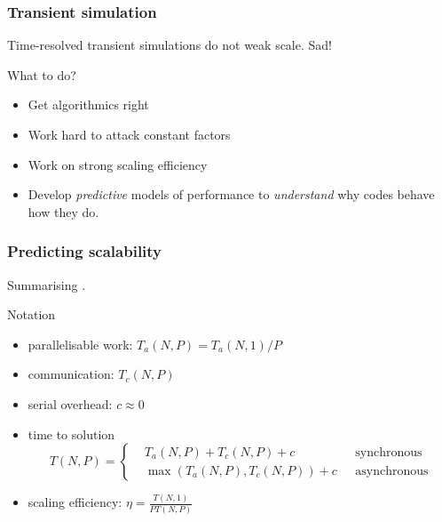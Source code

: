 \documentclass[presentation]{beamer}
\begin{document}
\begin{frame}
  \frametitle{Transient simulation}
  {\large
    Time-resolved transient simulations do not weak scale. Sad!
  }

  \begin{block}{What to do?}
    \begin{itemize}
    \item Get algorithmics right
    \item Work hard to attack constant factors
    \item Work on strong scaling efficiency
    \item Develop \emph{predictive} models of performance to
      \emph{understand} why codes behave how they do.
    \end{itemize}
  \end{block}

\end{frame}

\begin{frame}
  \frametitle{Predicting scalability}

  Summarising \textcite{Fischer:2015}.
  
  \begin{block}{Notation}
    \begin{itemize}
    \item parallelisable work: $T_a(N, P) = T_a(N, 1)/P$

    \item communication: $T_c(N, P)$

    \item serial overhead: $c \approx 0$

    \item time to solution
      \begin{equation*}
        T(N, P) = \left\{
          \begin{split}
            &T_a(N, P) + T_c(N, P) + c &\text{ synchronous}\\
            &\max(T_a(N, P), T_c(N, P)) + c\,\,&\text{ asynchronous}
          \end{split}\right.
      \end{equation*}

    \item scaling efficiency: $\eta = \frac{T(N, 1)}{PT(N,P)}$
  \end{itemize}
  \end{block}
\end{frame}
\end{document}
